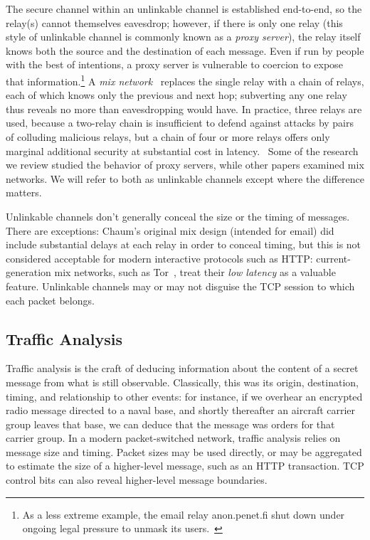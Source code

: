\documentclass{zarticle}
\begin{document}
The secure channel within an unlinkable channel is established
end-to-end, so the relay(s) cannot themselves eavesdrop; however, if
there is only one relay (this style of unlinkable channel is commonly
known as a \emph{proxy server}), the relay itself knows both the
source and the destination of each message.  Even if run by people
with the best of intentions, a proxy server is vulnerable to coercion
to expose that information.\footnote{As a less extreme example, the
  email relay \textsf{anon.penet.fi} shut down under ongoing legal
  pressure to unmask its users.~\cite{newman1996church}} A \emph{mix
  network}~\cite{chaum1981mix} replaces the single relay with a chain
of relays, each of which knows only the previous and next hop;
subverting any one relay thus reveals no more than eavesdropping would
have.  In practice, three relays are used, because a two-relay chain
is insufficient to defend against attacks by pairs of colluding
malicious relays, but a chain of four or more relays offers only
marginal additional security at substantial cost in
latency.~\cite{wright2002analysis,wright2003defending} Some of the
research we review studied the behavior of proxy servers, while other
papers examined mix networks.  We will refer to both as unlinkable
channels except where the difference matters.

Unlinkable channels don't generally conceal the size or the timing of
messages.  There are exceptions: Chaum's original mix design (intended
for email) did include substantial delays at each relay in order to
conceal timing, but this is not considered acceptable for modern
interactive protocols such as HTTP: current-generation mix networks,
such as Tor~\cite{dingledine2004tor}, treat their \emph{low latency}
as a valuable feature.  Unlinkable channels may or may not disguise
the TCP session to which each packet belongs.

\subsection{Traffic Analysis}

Traffic analysis is the craft of deducing information about the
content of a secret message from what is still observable.
Classically, this was its origin, destination, timing, and
relationship to other events: for instance, if we overhear an
encrypted radio message directed to a naval base, and shortly
thereafter an aircraft carrier group leaves that base, we can deduce
that the message was orders for that carrier group.  In a modern
packet-switched network, traffic analysis relies on message size and
timing.  Packet sizes may be used directly, or may be aggregated to
estimate the size of a higher-level message, such as an HTTP
transaction.  TCP control bits can also reveal higher-level message
boundaries.
\end{document}
